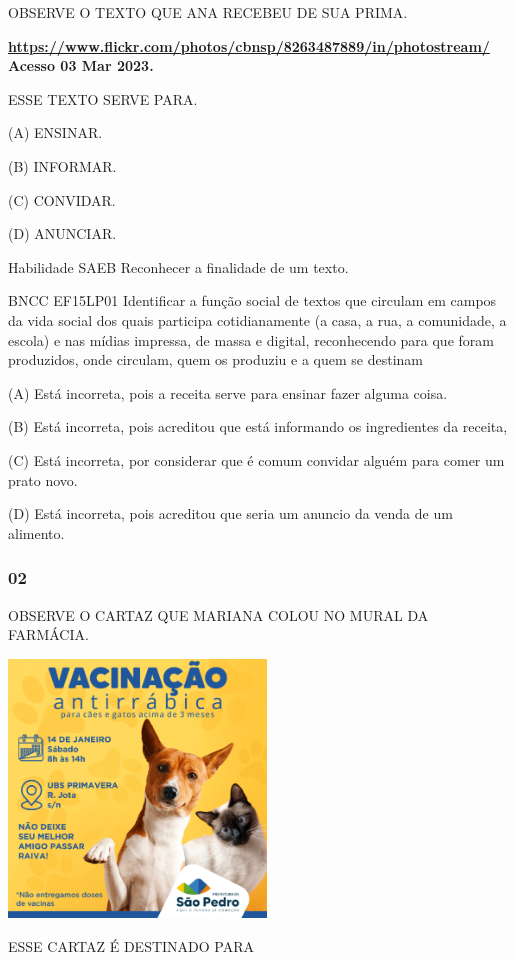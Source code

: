 OBSERVE O TEXTO QUE ANA RECEBEU DE SUA PRIMA.

\textbf{\url{https://www.flickr.com/photos/cbnsp/8263487889/in/photostream/}
Acesso 03 Mar 2023.}

ESSE TEXTO SERVE PARA.

(A) ENSINAR.

(B) INFORMAR.

(C) CONVIDAR.

(D) ANUNCIAR.

Habilidade SAEB Reconhecer a finalidade de um texto.

BNCC EF15LP01 Identificar a função social de textos que circulam em
campos da vida social dos quais participa cotidianamente (a casa, a rua,
a comunidade, a escola) e nas mídias impressa, de massa e digital,
reconhecendo para que foram produzidos, onde circulam, quem os produziu
e a quem se destinam

(A) Está incorreta, pois a receita serve para ensinar fazer alguma
coisa.

(B) Está incorreta, pois acreditou que está informando os ingredientes
da receita,

(C) Está incorreta, por considerar que é comum convidar alguém para
comer um prato novo.

(D) Está incorreta, pois acreditou que seria um anuncio da venda de um
alimento.

\subsubsection{02}\label{section-53}

OBSERVE O CARTAZ QUE MARIANA COLOU NO MURAL DA FARMÁCIA.

\includegraphics[width=2.70149in,height=2.70149in]{media/image115.png}

ESSE CARTAZ É DESTINADO PARA

